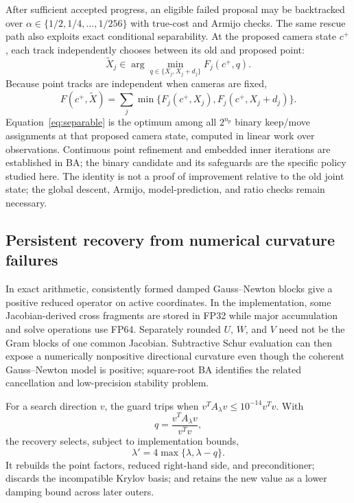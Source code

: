 \documentclass[10pt]{article}
\begin{document}
After sufficient accepted progress, an eligible failed proposal may be backtracked over $\alpha\in\{1/2,1/4,\ldots,1/256\}$ with true-cost and Armijo checks.  The same rescue path also exploits exact conditional separability.  At the proposed camera state $c^+$, each track independently chooses between its old and proposed point:
\begin{equation}
  \widetilde X_j\in\arg\min_{q\in\{X_j,X_j+d_j\}}F_j(c^+,q). \label{eq:track-choice}
\end{equation}
Because point tracks are independent when cameras are fixed,
\begin{equation}
  F(c^+,\widetilde X)=\sum_j\min\{F_j(c^+,X_j),F_j(c^+,X_j+d_j)\}. \label{eq:separable}
\end{equation}
Equation~\eqref{eq:separable} is the optimum among all $2^{n_p}$ binary keep/move assignments at that proposed camera state, computed in linear work over observations.  Continuous point refinement and embedded inner iterations are established in BA\cite{Jeong2012,Ceres}; the binary candidate and its safeguards are the specific policy studied here.  The identity is not a proof of improvement relative to the old joint state; the global descent, Armijo, model-prediction, and ratio checks remain necessary.

\subsection{Persistent recovery from numerical curvature failures}

In exact arithmetic, consistently formed damped Gauss--Newton blocks give a positive reduced operator on active coordinates.  In the implementation, some Jacobian-derived cross fragments are stored in FP32 while major accumulation and solve operations use FP64.  Separately rounded $U$, $W$, and $V$ need not be the Gram blocks of one common Jacobian.  Subtractive Schur evaluation can then expose a numerically nonpositive directional curvature even though the coherent Gauss--Newton model is positive; square-root BA identifies the related cancellation and low-precision stability problem\cite{Demmel2021}.

For a search direction $v$, the guard trips when $v^TA_\lambda v\le10^{-14}v^Tv$.  With
\[
  q=\frac{v^TA_\lambda v}{v^Tv},
\]
the recovery selects, subject to implementation bounds,
\begin{equation}
  \lambda'=4\max\{\lambda,\lambda-q\}. \label{eq:repair}
\end{equation}
It rebuilds the point factors, reduced right-hand side, and preconditioner; discards the incompatible Krylov basis; and retains the new value as a lower damping bound across later outers.
\end{document}
